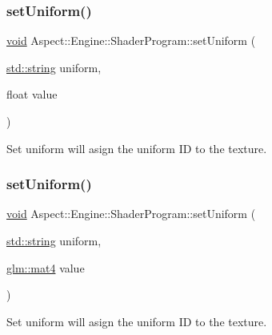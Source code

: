\subsubsection{\texorpdfstring{set\+Uniform()}{setUniform()}\hspace{0.1cm}{\footnotesize\ttfamily [2/4]}}
{\footnotesize\ttfamily \mbox{\hyperlink{_s_d_l__opengles2__gl2ext_8h_ae5d8fa23ad07c48bb609509eae494c95}{void}} Aspect\+::\+Engine\+::\+Shader\+Program\+::set\+Uniform (\begin{DoxyParamCaption}\item[{\mbox{\hyperlink{_s_d_l__opengl__glext_8h_ae84541b4f3d8e1ea24ec0f466a8c568b}{std\+::string}}}]{uniform,  }\item[{float}]{value }\end{DoxyParamCaption})}



Set uniform will asign the uniform ID to the texture. 

\mbox{\label{class_aspect_1_1_engine_1_1_shader_program_a9ed3540c0a42dd353b4c18b3df99d279}} 
\subsubsection{\texorpdfstring{set\+Uniform()}{setUniform()}\hspace{0.1cm}{\footnotesize\ttfamily [3/4]}}
{\footnotesize\ttfamily \mbox{\hyperlink{_s_d_l__opengles2__gl2ext_8h_ae5d8fa23ad07c48bb609509eae494c95}{void}} Aspect\+::\+Engine\+::\+Shader\+Program\+::set\+Uniform (\begin{DoxyParamCaption}\item[{\mbox{\hyperlink{_s_d_l__opengl__glext_8h_ae84541b4f3d8e1ea24ec0f466a8c568b}{std\+::string}}}]{uniform,  }\item[{\mbox{\hyperlink{group__core__types_ga7dcd2365c2e368e6af5b7adeb6a9c8df}{glm\+::mat4}}}]{value }\end{DoxyParamCaption})}



Set uniform will asign the uniform ID to the texture. 

\mbox{\label{class_aspect_1_1_engine_1_1_shader_program_abfaf605b8dfade33b086b2f33e07762b}} 
